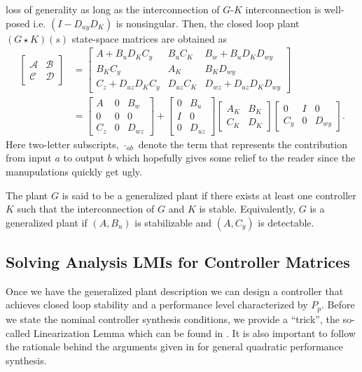 loss of generality as long as the interconnection of $G$-$K$ interconnection is well-posed i.e. $(I-D_{uy}D_K)$ is nonsingular. Then, 
the closed loop plant $(G\star K)(s)$ state-space matrices are obtained as
\begin{align}
\left[\begin{array}{c|c}
\mathcal{A}	&\mathcal{B} \\\hline
\mathcal{C}	&\mathcal{D}
\end{array}
\right] &= \left[\begin{array}{cc|c}
A + B_uD_KC_y        & B_uC_K    & B_w + B_uD_KD_{wy} \\
B_KC_y               & A_K       & B_KD_{wy}\\ \hline
C_z +  D_{uz}D_KC_y  & D_{uz}C_K & D_{wz} + D_{uz}D_KD_{wy}
\end{array}\right] \\
&= \left[
\begin{array}{cc|c}
A   & 0  & B_w \\
0   & 0  & 0\\ \hline
C_z & 0  & D_{wz}
\end{array}
\right] + 
\left[
\begin{array}{cc}
0  & B_u \\
I  & 0\\ \hline
0  & D_{uz}
\end{array}
\right]
\left[
\begin{array}{cc}
A_K  & B_K \\
C_K  & D_K
\end{array}
\right]
\left[
\begin{array}{cc|c}
0   & I & 0\\
C_y & 0 & D_{wy}
\end{array}
\right].
\label{eq:nominalclinc}
\end{align}
Here two-letter subscripts, $\cdot_{ab}$ denote the term that represents the contribution from input $a$ to output $b$ which hopefully gives some
relief to the reader since the manupulations quickly get ugly. 

\begin{define} The plant $G$ is said to be a generalized plant if there exists at least one controller 
$K$ such that the interconnection of $G$ and $K$ is stable. Equivalently, $G$ is a generalized plant if $(A,B_u)$ is stabilizable
and $(A,C_y)$ is detectable. 
\end{define}


\subsection{Solving Analysis LMIs for Controller Matrices}
Once we have the generalized plant description we can design a controller that achieves closed loop stability and a performance level 
characterized by $P_p$. Before we state the nominal controller synthesis conditions, we provide a \enquote{trick}, the so-called 
Linearization Lemma which can be found in \cite{lmibook99}. It is also important to follow the rationale behind the arguments given
in \cite{scherermulti} for general quadratic performance synthesis. 


